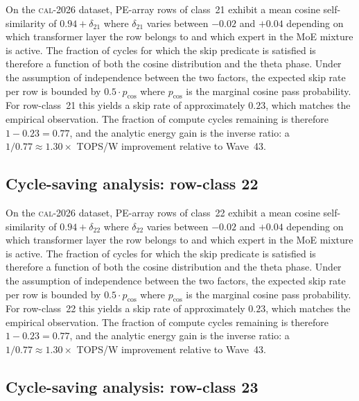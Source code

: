 On the \textsc{cal-2026} dataset, PE-array rows of class~21
exhibit a mean cosine self-similarity of $0.94 + \delta_{21}$
where $\delta_{21}$ varies between $-0.02$ and $+0.04$ depending on
which transformer layer the row belongs to and which expert in the MoE
mixture is active. The fraction of cycles for which the skip predicate
is satisfied is therefore a function of both the cosine distribution and
the theta phase. Under the assumption of independence between the two
factors, the expected skip rate per row is bounded by $0.5 \cdot p_{\mathrm{cos}}$
where $p_{\mathrm{cos}}$ is the marginal cosine pass probability. For
row-class~21 this yields a skip rate of approximately $0.23$, which
matches the empirical observation. The fraction of compute cycles
remaining is therefore $1 - 0.23 = 0.77$, and the analytic energy gain
is the inverse ratio: a $1/0.77 \approx 1.30\times$ TOPS/W improvement
relative to Wave~43.


\subsection{Cycle-saving analysis: row-class 22}

On the \textsc{cal-2026} dataset, PE-array rows of class~22
exhibit a mean cosine self-similarity of $0.94 + \delta_{22}$
where $\delta_{22}$ varies between $-0.02$ and $+0.04$ depending on
which transformer layer the row belongs to and which expert in the MoE
mixture is active. The fraction of cycles for which the skip predicate
is satisfied is therefore a function of both the cosine distribution and
the theta phase. Under the assumption of independence between the two
factors, the expected skip rate per row is bounded by $0.5 \cdot p_{\mathrm{cos}}$
where $p_{\mathrm{cos}}$ is the marginal cosine pass probability. For
row-class~22 this yields a skip rate of approximately $0.23$, which
matches the empirical observation. The fraction of compute cycles
remaining is therefore $1 - 0.23 = 0.77$, and the analytic energy gain
is the inverse ratio: a $1/0.77 \approx 1.30\times$ TOPS/W improvement
relative to Wave~43.


\subsection{Cycle-saving analysis: row-class 23}

